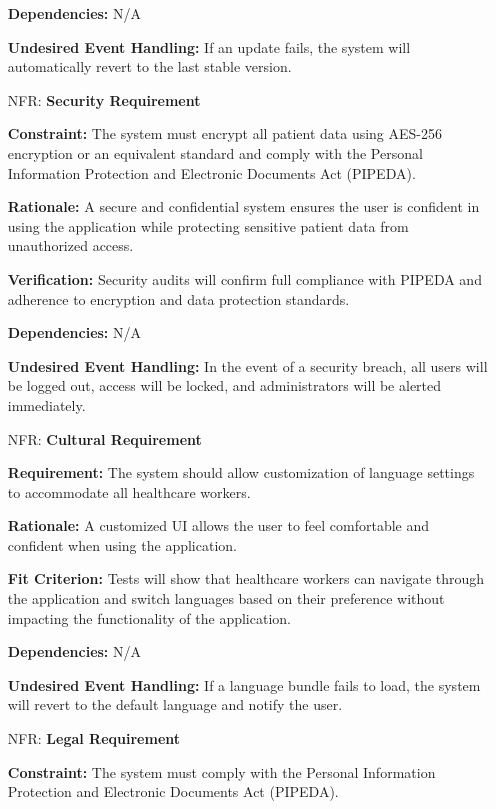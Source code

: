 \documentclass[12pt]{article}
\newcounter{nfrnum} %
\begin{document}
\begin{itemize}
    \textbf{Dependencies:} N/A

    \textbf{Undesired Event Handling:} If an update fails, the system will automatically revert to the last stable version.

    \item[NFR\refstepcounter{nfrnum}\thenfrnum \label{NFR_Security}:] \textbf{Security Requirement}

    \textbf{Constraint:} The system must encrypt all patient data using AES-256 encryption or an equivalent standard and comply with the Personal Information Protection and Electronic Documents Act (PIPEDA).

    \textbf{Rationale:} A secure and confidential system ensures the user is confident in using the application while protecting sensitive patient data from unauthorized access.
    
    \textbf{Verification:} Security audits will confirm full compliance with PIPEDA and adherence to encryption and data protection standards.
    
    \textbf{Dependencies:} N/A
    
    \textbf{Undesired Event Handling:} In the event of a security breach, all users will be logged out, access will be locked, and administrators will be alerted immediately.

\item[NFR\refstepcounter{nfrnum}\thenfrnum \label{NFR_Cultural}:] \textbf{Cultural Requirement}

    \textbf{Requirement:} The system should allow customization of language settings to accommodate all healthcare workers.

    \textbf{Rationale:} A customized UI allows the user to feel comfortable and confident when using the application.

    \textbf{Fit Criterion:} Tests will show that healthcare workers can navigate through the application and switch languages based on their preference without impacting the functionality of the application.

    \textbf{Dependencies:} N/A

    \textbf{Undesired Event Handling:} If a language bundle fails to load, the system will revert to the default language and notify the user.

\item[NFR\refstepcounter{nfrnum}\thenfrnum \label{NFR_Legal}:] \textbf{Legal Requirement}

    \textbf{Constraint:} The system must comply with the Personal Information Protection and Electronic Documents Act (PIPEDA).


\end{itemize}
\end{document}
